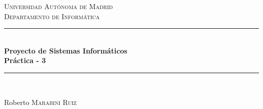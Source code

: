 \documentclass[12pt]{article} %
\begin{document}

\begin{titlepage}

\newcommand{\HRule}{\rule{\linewidth}{0.5mm}} %

\center %

\textsc{\LARGE Universidad Aut\'{o}noma de Madrid}\\[1.5cm] %
\textsc{\Large Departamento de Inform\'{a}tica}\\[0.5cm] %

\HRule \\[0.4cm]
{ \huge \bfseries Proyecto de Sistemas Inform\'{a}ticos\\[0.5cm] Pr\'{a}ctica - 3}\\[0.4cm] %
\HRule \\[1.5cm]





\vfill %
\begin{flushright}
 \large
Roberto  \textsc{Marabini Ruiz} %
\end{flushright}

\end{titlepage}
\end{document}
